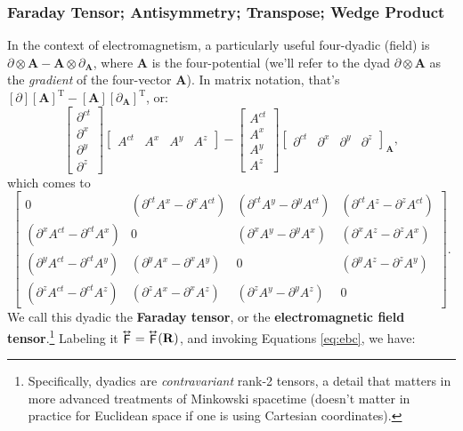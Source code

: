\documentclass[12pt]{article}
\renewcommand{\vv}[1]{\mathbf{#1}}
\newcommand{\tightoverset}[2]{%
  \mathop{#2}\limits^{\vbox to -.5ex{\kern-0.75ex\hbox{$#1$}\vss}}}
\newcommand{\inlinedy}[1]{\tightoverset{\text{\tiny$\bm\leftrightarrow$}}{#1}}
\begin{document}
\subsubsection{Faraday Tensor; Antisymmetry; Transpose; Wedge Product}

In the context of electromagnetism, a particularly useful four-dyadic (field) is $\partialup \otimes \vv A - \vv A \otimes \partialup_{\vv A}$, where $\vv A$ is the four-potential (we'll refer to the dyad $\partialup \otimes \vv A$ as the \emph{gradient} of the four-vector $\vv A$). In matrix notation, that's ${[\partialup][\vv A]^{\mathrm{T}} - [\vv A][\partialup_{\vv A}]^{\mathrm{T}}}$, or:
\begin{equation*}
\begin{bmatrix}
\partial^{ct} \\
\partial^x \\
\partial^y \\
\partial^z
\end{bmatrix}
\begin{bmatrix}
A^{ct} & A^x & A^y & A^z
\end{bmatrix}
-
\begin{bmatrix}
A^{ct} \\
A^x \\
A^y \\
A^z
\end{bmatrix}
\begin{bmatrix}
\partial^{ct} & \partial^x & \partial^y & \partial^z
\end{bmatrix}_{\vv A},
\end{equation*}
which comes to
\begin{equation*}
\begin{bmatrix}
0 & ( \partial^{ct} A^x - \partial^x A^{ct} ) & ( \partial^{ct} A^y - \partial^y A^{ct} ) & ( \partial^{ct} A^z - \partial^z A^{ct} ) \\[1.5ex]
( \partial^x A^{ct} - \partial^{ct} A^x ) & 0 & ( \partial^x A^y - \partial^y A^x ) & ( \partial^x A^z - \partial^z A^x ) \\[1.5ex]
( \partial^y A^{ct} - \partial^{ct} A^y ) & ( \partial^y A^x - \partial^x A^y ) & 0 & ( \partial^y A^z - \partial^z A^y ) \\[1.5ex]
( \partial^z A^{ct} - \partial^{ct} A^z ) & ( \partial^z A^x - \partial^x A^z ) & ( \partial^z A^y - \partial^y A^z ) & 0
\end{bmatrix} .
\end{equation*}
We call this dyadic the \textbf{Faraday tensor}, or the \textbf{electromagnetic field tensor}.\footnote{\label{fn:dy}Specifically, dyadics are \emph{contravariant} rank-2 tensors, a detail that matters in more advanced treatments of Minkowski spacetime (doesn't matter in practice for Euclidean space if one is using Cartesian coordinates).} Labeling it $\inlinedy{\mathsf{F}} = \inlinedy{\mathsf{F}} (\vv R)$, and invoking Equations \ref{eq:ebc}, we have:
\end{document}
